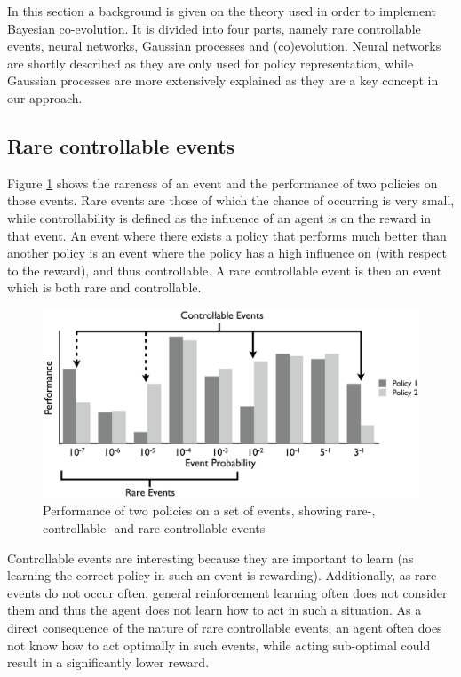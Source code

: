 In this section a background is given on the theory used in order to implement Bayesian co-evolution. It is divided into four parts, namely rare controllable events, neural networks, Gaussian processes and (co)evolution. Neural networks are shortly described as they are only used for policy representation, while Gaussian processes are more extensively explained as they are a key concept in our approach.

\subsection{Rare controllable events}
Figure \ref{rareControllableImage} shows the rareness of an event and the performance of two policies on those events. Rare events are those of which the chance of occurring is very small, while controllability is defined as the influence of an agent is on the reward in that event. An event where there exists a policy that performs much better than another policy is an event where the policy has a high influence on (with respect to the reward), and thus controllable. A rare controllable event is then an event which is both rare and controllable.

\begin{figure}[h]
  \centering
  \includegraphics{images/rare-controllable.png}
  \caption{Performance of two policies on a set of events, showing rare-, controllable- and rare controllable events}\label{rareControllableImage}
\end{figure}

Controllable events are interesting because they are important to learn (as learning the correct policy in such an event is rewarding). Additionally, as rare events do not occur often, general reinforcement learning often does not consider them and thus the agent does not learn how to act in such a situation. As a direct consequence of the nature of rare controllable events, an agent often does not know how to act optimally in such events, while acting sub-optimal could result in a significantly lower reward.


